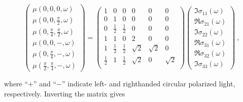 \documentclass[twocolumn,prb,twocolumn,amsmath,superscriptaddress,nofootinbib,amssymb]{revtex4-1}
\begin{document}
\begin{widetext}
\begin{equation}
\left(
\begin{array}{c}
\mu(0,0,0,\omega)  \\
\mu(0,0,\frac{\pi}{2},\omega)   \\
\mu(0,\frac{\pi}{4},\frac{\pi}{2},\omega)  \\
\mu(0,0,-,\omega)   \\
\mu(0,\frac{\pi}{4},-,\omega)  \\
\mu(\frac{\pi}{2},\frac{\pi}{4},-,\omega)
\end{array}
\right)
=
\left(
\begin{array}{cccccc}
1 & 0 & 0 & 0 & 0 & 0 \\
0 & 1 & 0 & 0 & 0 & 0 \\
0 & \frac{1}{2} & \frac{1}{2} & 0 & 0 & 0 \\
1 & 1 & 0 & 2 & 0 & 0 \\
1 & \frac{1}{2} & \frac{1}{2} & \sqrt{2} & \sqrt{2} & 0 \\
\frac{1}{2} & 1 & \frac{1}{2} & \sqrt{2} & 0 & \sqrt{2} \\
\end{array}
\right)
\left(
\begin{array}{c}
\Im{\sigma _{11}(\omega)}  \\
\Re{\sigma _{21}(\omega)}   \\
\Im{\sigma _{22}(\omega)}   \\
\Re{\sigma _{31}(\omega)}   \\
  \Re{\sigma _{32}(\omega)}  \\
  \Im{\sigma _{33}(\omega)}
\end{array}
\right)~,
\end{equation}

\noindent where ``$+$'' and ``$-$'' indicate left- and righthanded circular polarized light, respectively. Inverting the matrix gives


\end{widetext}
\end{document}
